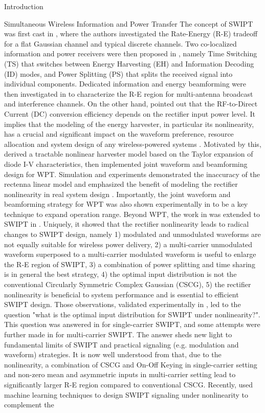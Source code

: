 \documentclass[journal]{IEEEtran}
\begin{document}
\begin{section}{Introduction}
\begin{subsection}{Simultaneous Wireless Information and Power Transfer}
			The concept of SWIPT was first cast in \cite{Varshney2008}, where the authors investigated the Rate-Energy (R-E) tradeoff for a flat Gaussian channel and typical discrete channels. Two co-localized information and power receivers were then proposed in \cite{Zhou2013}, namely Time Switching (TS) that switches between Energy Harvesting (EH) and Information Decoding (ID) modes, and Power Splitting (PS) that splits the received signal into individual components. Dedicated information and energy beamforming were then investigated in \cite{Zhang2013,Park2014} to characterize the R-E region for multi-antenna broadcast and interference channels. On the other hand, \cite{Trotter2009} pointed out that the RF-to-Direct Current (DC) conversion efficiency depends on the rectifier input power level. It implies that the modeling of the energy harvester, in particular its nonlinearity, has a crucial and significant impact on the waveform preference, resource allocation and system design of any wireless-powered systems \cite{Trotter2009,Clerckx2018,Clerckx2019}. Motivated by this, \cite{Clerckx2016a} derived a tractable nonlinear harvester model based on the Taylor expansion of diode I-V characteristics, then implemented joint waveform and beamforming design for WPT. Simulation and experiments demonstrated the inaccuracy of the rectenna linear model and emphasized the benefit of modeling the rectifier nonlinearity in real system design \cite{Kim2019,Kim2020a}. Importantly, the joint waveform and beamforming strategy for WPT was also shown experimentally in \cite{Kim2020} to be a key technique to expand operation range. Beyond WPT, the work in \cite{Clerckx2016a} was extended to SWIPT in \cite{Clerckx2018b}. Uniquely, it showed that the rectifier nonlinearity leads to radical changes to SWIPT design, namely 1) modulated and unmodulated waveforms are not equally suitable for wireless power delivery, 2) a multi-carrier unmodulated waveform superposed to a multi-carrier modulated waveform is useful to enlarge the R-E region of SWIPT, 3) a combination of power splitting and time sharing is in general the best strategy, 4) the optimal input distribution is not the conventional Circularly Symmetric Complex Gaussian (CSCG), 5) the rectifier nonlinearity is beneficial to system performance and is essential to efficient SWIPT design. Those observations, validated experimentally in \cite{Kim2019},  led to the question "what is the optimal input distribution for SWIPT under nonlinearity?". This question was answered in \cite{Varasteh2020} for single-carrier SWIPT, and some attempts were further made in \cite{Varasteh2019d} for multi-carrier SWIPT. The answer sheds new light to fundamental limits of SWIPT and practical signaling (e.g. modulation and waveform) strategies. It is now well understood from \cite{Clerckx2018b,Varasteh2020,Varasteh2019d} that, due to the nonlinearity, a combination of CSCG and On-Off Keying in single-carrier setting and non-zero mean and asymmetric inputs in multi-carrier setting lead to significantly larger R-E region compared to conventional CSCG. Recently, \cite{Varasteh2020a} used machine learning techniques to design SWIPT signaling under nonlinearity to complement the 
\end{subsection}
\end{section}
\end{document}
